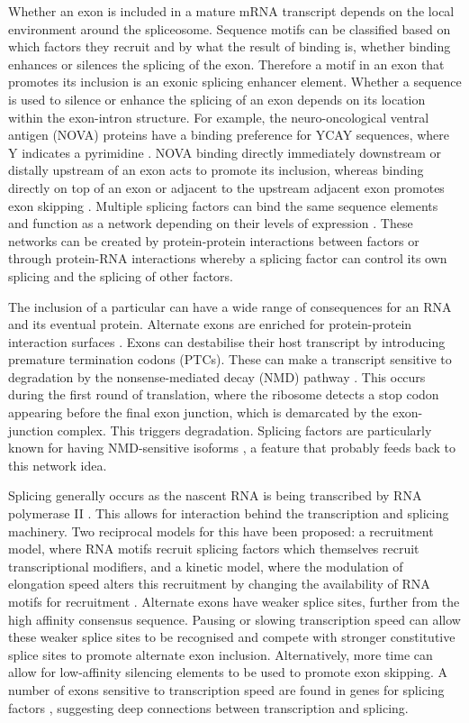 Whether an exon is included in a mature mRNA transcript depends on the local environment around the spliceosome.
Sequence motifs can be classified based on which factors they recruit and by what the result of binding is, whether binding enhances or silences the splicing of the exon.
Therefore a motif in an exon that promotes its inclusion is an exonic splicing enhancer element. 
Whether a sequence is used to silence or enhance the splicing of an exon depends on its location within the exon-intron structure.
For example, the neuro-oncological ventral antigen (NOVA) proteins have a binding preference for YCAY sequences, where Y indicates a pyrimidine \citep{Buckanovich1996,Jensen2000}.
NOVA binding directly immediately downstream or distally upstream of an exon acts to promote its inclusion, whereas binding directly on top of an exon or adjacent to the upstream adjacent exon promotes exon skipping \citep{Ule2006}.
Multiple splicing factors can bind the same sequence elements and function as a network depending on their levels of expression \citep{Wang2013a}.
These networks can be created by protein-protein interactions between factors or through protein-RNA interactions whereby a splicing factor can control its own splicing and the splicing of other factors. 

The inclusion of a particular can have a wide range of consequences for an RNA and its eventual protein. 
Alternate exons are enriched for protein-protein interaction surfaces \citep{Ellis2012}. 
Exons can destabilise their host transcript by introducing premature termination codons (PTCs). 
These can make a transcript sensitive to degradation by the nonsense-mediated decay (NMD) pathway \citep{McGlincy2008-wh}. 
This occurs during the first round of translation, where the ribosome detects a stop codon appearing before the final exon junction, which is demarcated by the exon-junction complex.
This triggers degradation.  %
Splicing factors are particularly known for having NMD-sensitive isoforms \citep{Ni2007}, a feature that probably feeds back to this network idea. %

Splicing generally occurs as the nascent RNA is being transcribed by RNA polymerase II \citep{Beyer1988,Ameur2011}.
This allows for interaction behind the transcription and splicing machinery.
Two reciprocal models for this have been proposed: a recruitment model, where RNA motifs recruit splicing factors which themselves recruit transcriptional modifiers, and a kinetic model, where the modulation of elongation speed alters this recruitment by changing the availability of RNA motifs for recruitment \citep{Kornblihtt2004a}.
Alternate exons have weaker splice sites, further from the high affinity consensus sequence. %
Pausing or slowing transcription speed can allow these weaker splice sites to be recognised and compete with stronger constitutive splice sites to promote alternate exon inclusion.
Alternatively, more time can allow for low-affinity silencing elements to be used to promote exon skipping.
A number of exons sensitive to transcription speed are found in genes for splicing factors \citep{Ip2011}, suggesting deep connections between transcription and splicing. 

